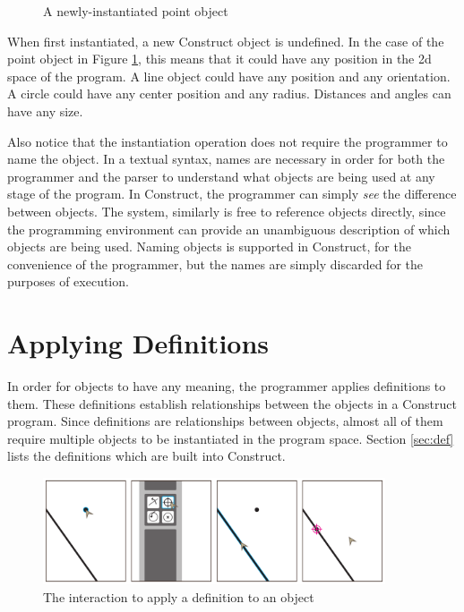 \documentclass[twoside,11pt]{report}
\begin{document}
\begin{figure}[h]
  \centering
  \fbox{
    \begin{minipage}{2in}\hfill\vspace{1.5in}\end{minipage}
  }
  \caption{A newly-instantiated point object}
  \label{fig:new-point}
\end{figure}

When first instantiated, a new Construct object is undefined. 
In the case of the point object in Figure \ref{fig:new-point}, this means that it could have any position in the 2d space of the program. 
A line object could have any position and any orientation.
A circle could have any center position and any radius. 
Distances and angles can have any size.

Also notice that the instantiation operation does not require the programmer to name the object. 
In a textual syntax, names are necessary in order for both the programmer and the parser to understand what objects are being used at any stage of the program.
In Construct, the programmer can simply {\it see} the difference between objects.
The system, similarly is free to reference objects directly, since the programming environment can provide an unambiguous description of which objects are being used.
Naming objects is supported in Construct, for the convenience of the programmer, but the names are simply discarded for the purposes of execution.

\section{Applying Definitions}
\label{sec:applydef}

In order for objects to have any meaning, the programmer applies definitions to them. 
These definitions establish relationships between the objects in a Construct program. 
Since definitions are relationships between objects, almost all of them require multiple objects to be instantiated in the program space. 
Section \ref{sec:def} lists the definitions which are built into Construct.

\begin{figure}[h]
  \centering
  \includegraphics[width=0.9\textwidth]{definition.pdf}
  \caption{The interaction to apply a definition to an object}
  \label{fig:def-interaction}
\end{figure}
\end{document}
